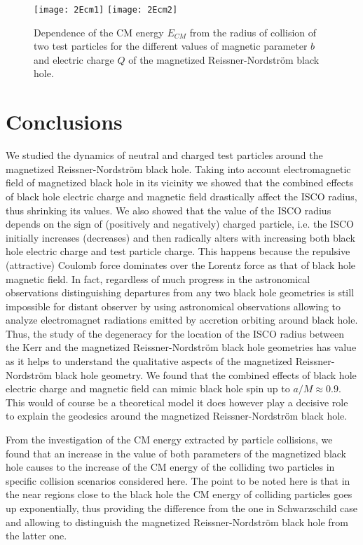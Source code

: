 \documentclass[showpacs,twocolumn,superscriptaddress]{revtex4}
\begin{document}
\begin{figure*}[t!]
	\begin{center}
		\texttt{[image: 2Ecm1]}
		\texttt{[image: 2Ecm2]}
	\end{center}
	\caption{Dependence of the CM energy $E_{CM}$ from the radius of collision of two test particles for the different values of magnetic parameter $b$ and electric charge $Q$ of the magnetized Reissner-Nordstr\"{o}m black hole.}\label{fig4}
\end{figure*}




\section{Conclusions}
\label{Sec:conclusion}
We studied the dynamics of neutral and charged test particles around the magnetized Reissner-Nordstr\"{o}m black hole. Taking into account electromagnetic field of magnetized black hole in its vicinity we showed that the combined effects of black hole electric charge and magnetic field drastically affect the ISCO radius, thus shrinking its values. We also showed that the value of the ISCO radius depends on the sign of (positively and negatively) charged particle, i.e.  the ISCO initially increases (decreases) and then radically alters with increasing both black hole electric charge and test particle charge. This happens because the repulsive (attractive) Coulomb force dominates over the Lorentz force as that of black hole magnetic field. In fact, regardless of much progress in the astronomical observations distinguishing departures from any two black hole geometries is still impossible for distant observer by using astronomical observations allowing to analyze electromagnet radiations emitted by accretion orbiting around black hole. Thus, the study of the degeneracy for the location of the ISCO radius between the Kerr and the magnetized Reissner-Nordstr\"{o}m black hole geometries has value as it helps to understand the qualitative aspects of the magnetized Reissner-Nordstr\"{o}m black hole geometry. We found that the combined effects of black hole electric charge and magnetic field can mimic black hole spin up to $a/M\approx 0.9$.  This would of course be a theoretical model it does however play a decisive role to explain the geodesics around the magnetized Reissner-Nordstr\"{o}m black hole.

From the investigation of the CM energy extracted by particle collisions, we found that an increase in the value of both parameters of the magnetized black hole causes to the increase of the CM energy of the colliding two particles in specific collision scenarios considered here. The point to be noted here is that in the near regions close to the black hole the CM energy of colliding particles goes up exponentially, thus providing the difference from the one in Schwarzschild case and allowing to distinguish the magnetized Reissner-Nordstr\"{o}m black hole from the latter one.
\end{document}
